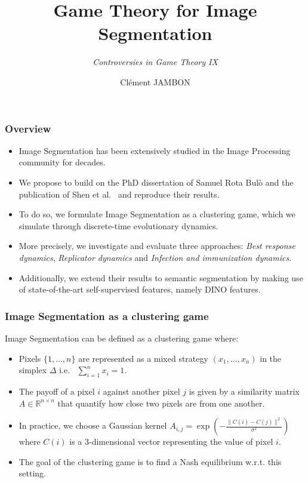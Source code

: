 \documentclass{beamer}
\title{Game Theory for Image Segmentation}
\subtitle{\textit{Controversies in Game Theory IX}}
\author[Clément JAMBON]{Clément JAMBON}
\institute[]{ETH Zürich}
\begin{document}
\frame{\titlepage}

\begin{frame}
    \frametitle{Overview}

    \begin{itemize}
        \item Image Segmentation has been extensively studied in the Image Processing community for decades.
        \item We propose to build on the PhD dissertation of Samuel Rota Bulò\cite{bulo-thesis} and the publication of Shen et al.~\cite{game-clustering} and reproduce their results.
        \item To do so, we formulate Image Segmentation as a clustering game, which we simulate through discrete-time evolutionary dynamics.
        \item More precisely, we investigate and evaluate three approaches: \textit{Best response dynamics}, \textit{Replicator dynamics} and \textit{Infection and immunization dynamics}\cite{inimdyn}.
        \item Additionally, we extend their results to semantic segmentation by making use of state-of-the-art self-supervised features, namely DINO\cite{dino} features.
    \end{itemize}

\end{frame}

\begin{frame}
    \frametitle{Image Segmentation as a clustering game}
    Image Segmentation can be defined as a clustering game where:
    \begin{itemize}
        \item Pixels $\{1, \ldots, n\}$ are represented as a mixed strategy $(x_1, \ldots, x_n)$ in the simplex $\Delta$ i.e.~ $\sum_{i=1}^nx_i=1$.
        \item The payoff of a pixel $i$ against another pixel $j$ is given by a similarity matrix $A\in\mathbb{R}^{n\times n}$ that quantify how close two pixels are from one another.
        \item In practice, we choose a Gaussian kernel $A_{i, j}=\exp\left(-\frac{\lVert C(i) - C(j)\rVert^2}{\sigma^2}\right)$ where $C(i)$ is a 3-dimensional vector representing the value of pixel $i$.
        \item The goal of the clustering game is to find a Nash equilibrium w.r.t. this setting.
    \end{itemize}
\end{frame}
\end{document}
